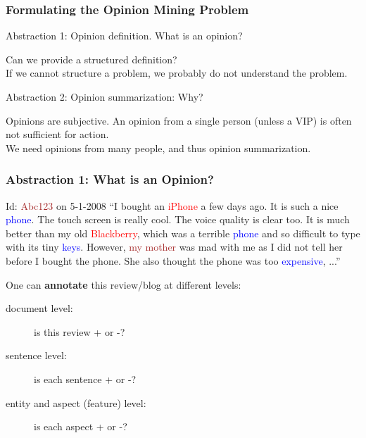 \documentclass[t]{beamer}
\begin{document}
\begin{frame} \frametitle{Formulating the Opinion Mining Problem} %


\begin{block}{Abstraction 1: Opinion definition. What is an opinion? }

Can we provide a structured definition? \\
If we cannot structure a problem, we probably do not understand the problem.

\end{block}

\begin{block}{Abstraction 2: Opinion summarization: Why?} 

Opinions are subjective. An opinion from a single person (unless a VIP) is often not sufficient for action. \\
We need opinions from many people, and thus opinion summarization.

\end{block}

\end{frame} 



\begin{frame} \frametitle{Abstraction 1: What is an Opinion?}


\begin{block}{Id: \textcolor{brown}{Abc123} on 5-1-2008} 
  ``I bought an \textcolor{red}{iPhone} a few days ago. It is such a
  nice \textcolor{blue}{phone}. The touch screen is really cool. The
  voice quality is clear too. It is much better than my old
  \textcolor{red}{Blackberry}, which was a terrible
  \textcolor{blue}{phone} and so difficult to type with its tiny
  \textcolor{blue}{keys}. However, \textcolor{brown}{my mother} was
  mad with me as I did not tell her before I bought the phone. She
  also thought the phone was too \textcolor{blue}{expensive}, ...''
\end{block}

One can \textbf{annotate} this review/blog at different levels:
\begin{description}  
\item [document level:]  is this review + or -? 
\item [sentence level:]  is each sentence + or -? 
\item [entity and aspect (feature) level:] is each aspect + or -?
 \end{description}

\end{frame} 
\end{document}
